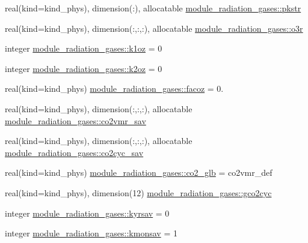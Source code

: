 \begin{DoxyCompactItemize}
\item 
real(kind=kind\+\_\+phys), dimension(\+:), allocatable \hyperlink{group__module__radiation__gases_gac7466def3963591ebfc48298806b1f6a}{module\+\_\+radiation\+\_\+gases\+::pkstr}
\item 
real(kind=kind\+\_\+phys), dimension(\+:,\+:,\+:), allocatable \hyperlink{group__module__radiation__gases_gad18392d991a9ef4b6ff0e8e822176a18}{module\+\_\+radiation\+\_\+gases\+::o3r}
\item 
integer \hyperlink{group__module__radiation__gases_ga0a14666484f230d3506a9b4740e2eeda}{module\+\_\+radiation\+\_\+gases\+::k1oz} = 0
\item 
integer \hyperlink{group__module__radiation__gases_ga0c3727c9e2a0bec46e84622c4591cd8b}{module\+\_\+radiation\+\_\+gases\+::k2oz} = 0
\item 
real(kind=kind\+\_\+phys) \hyperlink{group__module__radiation__gases_gac7c9fd8ece69872fdef473020ea03d6b}{module\+\_\+radiation\+\_\+gases\+::facoz} = 0.
\item 
real(kind=kind\+\_\+phys), dimension(\+:,\+:,\+:), allocatable \hyperlink{group__module__radiation__gases_ga4f35e5db780a64963dc65b8449def39d}{module\+\_\+radiation\+\_\+gases\+::co2vmr\+\_\+sav}
\item 
real(kind=kind\+\_\+phys), dimension(\+:,\+:,\+:), allocatable \hyperlink{group__module__radiation__gases_ga3985e306e5555089909fd42a4cc93afb}{module\+\_\+radiation\+\_\+gases\+::co2cyc\+\_\+sav}
\item 
real(kind=kind\+\_\+phys) \hyperlink{group__module__radiation__gases_ga0398d6837c9e8c41359e76a754147002}{module\+\_\+radiation\+\_\+gases\+::co2\+\_\+glb} = co2vmr\+\_\+def
\item 
real(kind=kind\+\_\+phys), dimension(12) \hyperlink{group__module__radiation__gases_gac2a03ad96c9aa598f9751fd689cb615f}{module\+\_\+radiation\+\_\+gases\+::gco2cyc}
\item 
integer \hyperlink{group__module__radiation__gases_ga6b4372e633bef3fb367e6ff3cf200bb8}{module\+\_\+radiation\+\_\+gases\+::kyrsav} = 0
\item 
integer \hyperlink{group__module__radiation__gases_gab1cf1b63398a3e7ec0334a7c97258b4d}{module\+\_\+radiation\+\_\+gases\+::kmonsav} = 1
\end{DoxyCompactItemize}
